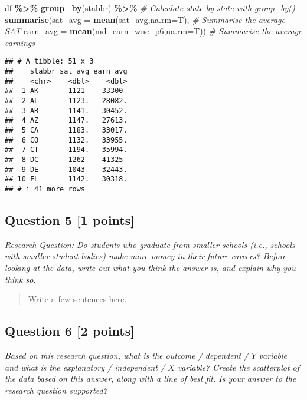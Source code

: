 \documentclass[
]{article}
\newenvironment{Shaded}{\begin{snugshade}}{\end{snugshade}}
\newcommand{\AttributeTok}[1]{\textcolor[rgb]{0.13,0.29,0.53}{#1}}
\newcommand{\CommentTok}[1]{\textcolor[rgb]{0.56,0.35,0.01}{\textit{#1}}}
\newcommand{\FunctionTok}[1]{\textcolor[rgb]{0.13,0.29,0.53}{\textbf{#1}}}
\newcommand{\NormalTok}[1]{#1}
\newcommand{\SpecialCharTok}[1]{\textcolor[rgb]{0.81,0.36,0.00}{\textbf{#1}}}
\begin{document}
\begin{Shaded}
\begin{Highlighting}[]
\NormalTok{df }\SpecialCharTok{\%\textgreater{}\%}
  \FunctionTok{group\_by}\NormalTok{(stabbr) }\SpecialCharTok{\%\textgreater{}\%} \CommentTok{\# Calculate state{-}by{-}state with group\_by()}
  \FunctionTok{summarise}\NormalTok{(}\AttributeTok{sat\_avg =} \FunctionTok{mean}\NormalTok{(sat\_avg,}\AttributeTok{na.rm=}\NormalTok{T), }\CommentTok{\# Summarise the average SAT}
            \AttributeTok{earn\_avg =} \FunctionTok{mean}\NormalTok{(md\_earn\_wne\_p6,}\AttributeTok{na.rm=}\NormalTok{T)) }\CommentTok{\# Summarise the average earnings}
\end{Highlighting}
\end{Shaded}

\begin{verbatim}
## # A tibble: 51 x 3
##    stabbr sat_avg earn_avg
##    <chr>    <dbl>    <dbl>
##  1 AK       1121    33300 
##  2 AL       1123.   28082.
##  3 AR       1141.   30452.
##  4 AZ       1147.   27613.
##  5 CA       1183.   33017.
##  6 CO       1132.   33955.
##  7 CT       1194.   35994.
##  8 DC       1262    41325 
##  9 DE       1043    32443.
## 10 FL       1142.   30318.
## # i 41 more rows
\end{verbatim}

\subsection{Question 5 {[}1 points{]}}\label{question-5-1-points}

\emph{Research Question: Do students who graduate from smaller schools
(i.e., schools with smaller student bodies) make more money in their
future careers? Before looking at the data, write out what you think the
answer is, and explain why you think so.}

\begin{quote}
Write a few sentences here.
\end{quote}

\subsection{Question 6 {[}2 points{]}}\label{question-6-2-points}

\emph{Based on this research question, what is the outcome / dependent /
\(Y\) variable and what is the explanatory / independent / \(X\)
variable? Create the scatterplot of the data based on this answer, along
with a line of best fit. Is your answer to the research question
supported?}
\end{document}
